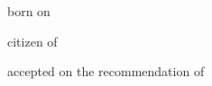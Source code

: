 {\begin{titlepage}
\begin{center}
      \textsc{\Large\authorstring} \\[1.5ex]
    \end{center}
		
		\vspace{0.8cm}
		
    \begin{center}
      \large \acatitlestring \\[1.5ex]

				\vspace{0.8cm}

       born on \dateofbirthstring \\[1.5ex]

		\vspace{0.2cm}

      citizen of \citizenstring
    \end{center}

		\vspace{2.0cm}

    \begin{center}
      \large accepted on the recommendation of \\[1.5ex]
      \examinerstring \\[1.5ex] \coexaminerstring
    \end{center}

		\vspace{2.0cm}


    \begin{center}
      \large\datestring
    \end{center}
		\endgroup
    \if@twoside
      \newpage
      \thispagestyle{empty}
    \fi
		\restoregeometry
  \end{titlepage}
}



\makeatletter
\renewcommand\chapter{\if@openright\cleardoublepage\else\clearpage\fi
                    \thispagestyle{plain}%
                    \global\@topnum\z@
                    \@afterindentfalse
                    \secdef\@chapter\@schapter}
\makeatother


